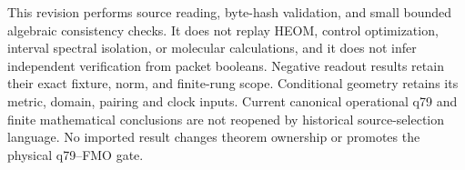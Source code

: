 \documentclass[11pt]{article}
\theoremstyle{definition}
\theoremstyle{remark}
\begin{document}
This revision performs source reading, byte-hash validation, and small
bounded algebraic consistency checks. It does not replay HEOM, control
optimization, interval spectral isolation, or molecular calculations, and
it does not infer independent verification from packet booleans. Negative
readout results retain their exact fixture, norm, and finite-rung scope.
Conditional geometry retains its metric, domain, pairing and clock inputs.
Current canonical operational q79 and finite mathematical conclusions are
not reopened by historical source-selection language. No imported result
changes theorem ownership or promotes the physical q79--FMO gate.


\end{document}
